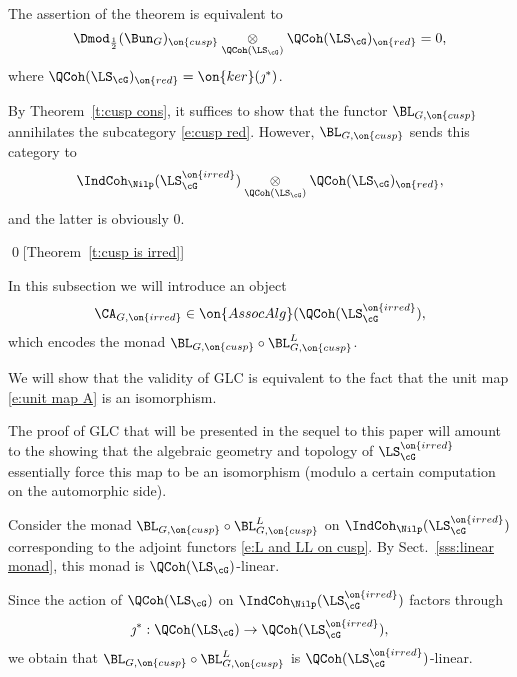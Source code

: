 \documentclass[9pt]{amsart}
\theoremstyle{remark}
\theoremstyle{definition}
\theoremstyle{remark}
\newcommand{\thmref}[1]{Theorem~\ref{#1}}
\newcommand{\secref}[1]{Sect.~\ref{#1}}
\numberwithin{equation}{section}
\begin{document}
\sssec{Proof of \thmref{t:cusp is irred}} \label{sss:cusp is irred}

The assertion of the theorem is equivalent to
\begin{equation} \label{e:cusp red}
\Dmod_{\frac{1}{2}}(\Bun_G)_{\on{cusp}}\underset{\QCoh(\LS_\cG)}\otimes \QCoh(\LS_\cG)_{\on{red}}=0,
\end{equation} 
where $\QCoh(\LS_\cG)_{\on{red}}=\on{ker}(\jmath^*)$.

\medskip

By \thmref{t:cusp cons}, it suffices to show that the functor $\BL_{G,\on{cusp}}$ annihilates the subcategory
\eqref{e:cusp red}. However, $\BL_{G,\on{cusp}}$ sends this category to
$$\IndCoh_\Nilp(\LS^{\on{irred}}_\cG)\underset{\QCoh(\LS_\cG)}\otimes \QCoh(\LS_\cG)_{\on{red}},$$
and the latter is obviously $0$.

\qed[\thmref{t:cusp is irred}]


In this subsection we will introduce an object
$$\CA_{G,\on{irred}}\in \on{AssocAlg}(\QCoh(\LS^{\on{irred}}_\cG),$$
which encodes the monad $\BL_{G,\on{cusp}}\circ \BL^L_{G,\on{cusp}}$.

\medskip

We will show that the validity of GLC is equivalent to the fact that the unit map \eqref{e:unit map A}
is an isomorphism.

\medskip

The proof of GLC that will be presented in the sequel to this paper will amount to the showing that the algebraic
geometry and topology of $\LS^{\on{irred}}_\cG$ essentially force this map to be an isomorphism
(modulo a certain computation on the automorphic side). 

\sssec{}

Consider the monad $\BL_{G,\on{cusp}}\circ \BL^L_{G,\on{cusp}}$ on $\IndCoh_\Nilp(\LS^{\on{irred}}_\cG)$ corresponding to the adjoint functors 
\eqref{e:L and LL on cusp}. By \secref{sss:linear monad}, this monad is $\QCoh(\LS_\cG)$-linear.

\medskip

Since the action of $\QCoh(\LS_\cG)$ on $\IndCoh_\Nilp(\LS^{\on{irred}}_\cG)$ factors through
$$\jmath^*:\QCoh(\LS_\cG)\to \QCoh(\LS^{\on{irred}}_\cG),$$
we obtain that $\BL_{G,\on{cusp}}\circ \BL^L_{G,\on{cusp}}$ is $\QCoh(\LS^{\on{irred}}_\cG)$-linear.

\sssec{} \label{sss:AG cusp}
\end{document}
